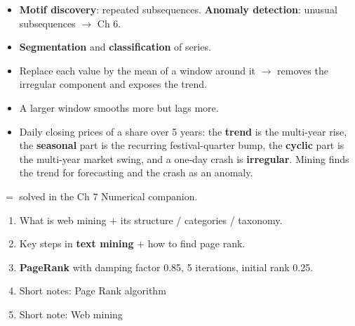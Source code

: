 {\begin{itemize}
  \begin{itemize}
    \item \emph{Whole-sequence} matching vs \emph{subsequence} matching.
    \item Needs \textbf{normalisation} (offset and amplitude) first, else scale dominates.
    \item \textbf{Dynamic Time Warping (DTW)} aligns series that are out of phase or run at
          different speeds --- Euclidean distance cannot. \added
  \end{itemize}
  \item \textbf{Motif discovery}: repeated subsequences. \quad
        \textbf{Anomaly detection}: unusual subsequences {\footnotesize$\rightarrow$ Ch 6}.
  \item \textbf{Segmentation} and \textbf{classification} of series.
\end{itemize}
\begin{itemize}
  \item Replace each value by the mean of a window around it $\rightarrow$ removes the irregular
        component and exposes the trend.
  \item A larger window smooths more but lags more.
\end{itemize}
\begin{itemize}
  \item Daily closing prices of a share over 5 years: the \textbf{trend} is the multi-year rise, the
        \textbf{seasonal} part is the recurring festival-quarter bump, the \textbf{cyclic} part is
        the multi-year market swing, and a one-day crash is \textbf{irregular}.
        Mining finds the trend for forecasting and the crash as an anomaly.
\end{itemize}}

\hr


{\color{sub}\footnotesize {} $=$ solved in the Ch 7 Numerical companion.}

\begin{enumerate}
  \item {} What is web mining $+$ its structure / categories / taxonomy.
        \hfill {}       
  \item {} Key steps in \textbf{text mining} $+$ how to find page rank. \hfill {} 
  \item {} \textbf{PageRank} with damping factor 0.85, 5 iterations, initial rank 0.25.
        \hfill {} 
  \item {} Short notes: Page Rank algorithm \hfill {}   
  \item {} Short note: Web mining \hfill {}    
\end{enumerate}

